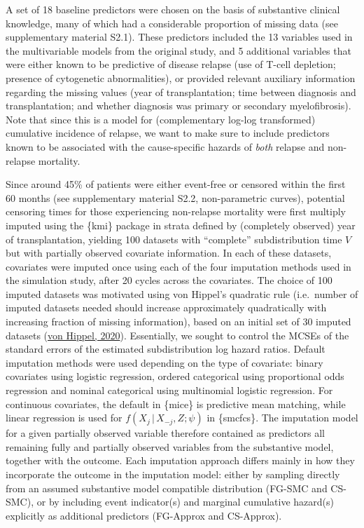 \documentclass[
  letterpaper,
  DIV=11,
  numbers=noendperiod]{scrreprt}
\newcommand{\given}{\,|\,}
\begin{document}
A set of 18 baseline predictors were chosen on the basis of substantive
clinical knowledge, many of which had a considerable proportion of
missing data (see supplementary material S2.1). These predictors
included the 13 variables used in the multivariable models from the
original study, and 5 additional variables that were either known to be
predictive of disease relapse (use of T-cell depletion; presence of
cytogenetic abnormalities), or provided relevant auxiliary information
regarding the missing values (year of transplantation; time between
diagnosis and transplantation; and whether diagnosis was primary or
secondary myelofibrosis). Note that since this is a model for
(complementary log-log transformed) cumulative incidence of relapse, we
want to make sure to include predictors known to be associated with the
cause-specific hazards of \emph{both} relapse and non-relapse mortality.

Since around 45\% of patients were either event-free or censored within
the first 60 months (see supplementary material S2.2, non-parametric
curves), potential censoring times for those experiencing non-relapse
mortality were first multiply imputed using the \{kmi\} package in
strata defined by (completely observed) year of transplantation,
yielding 100 datasets with ``complete'' subdistribution time \(V\) but
with partially observed covariate information. In each of these
datasets, covariates were imputed once using each of the four imputation
methods used in the simulation study, after 20 cycles across the
covariates. The choice of 100 imputed datasets was motivated using von
Hippel's quadratic rule (i.e.~number of imputed datasets needed should
increase approximately quadratically with increasing fraction of missing
information), based on an initial set of 30 imputed datasets
(\protect\hyperlink{ref-vonhippelHowManyImputations2020}{von Hippel,
2020}). Essentially, we sought to control the MCSEs of the standard
errors of the estimated subdistribution log hazard ratios. Default
imputation methods were used depending on the type of covariate: binary
covariates using logistic regression, ordered categorical using
proportional odds regression and nominal categorical using multinomial
logistic regression. For continuous covariates, the default in \{mice\}
is predictive mean matching, while linear regression is used for
\(f(X_j \given X_{-j}, Z;\psi)\) in \{smcfcs\}. The imputation model for
a given partially observed variable therefore contained as predictors
all remaining fully and partially observed variables from the
substantive model, together with the outcome. Each imputation approach
differs mainly in how they incorporate the outcome in the imputation
model: either by sampling directly from an assumed substantive model
compatible distribution (FG-SMC and CS-SMC), or by including event
indicator(s) and marginal cumulative hazard(s) explicitly as additional
predictors (FG-Approx and CS-Approx).
\end{document}
